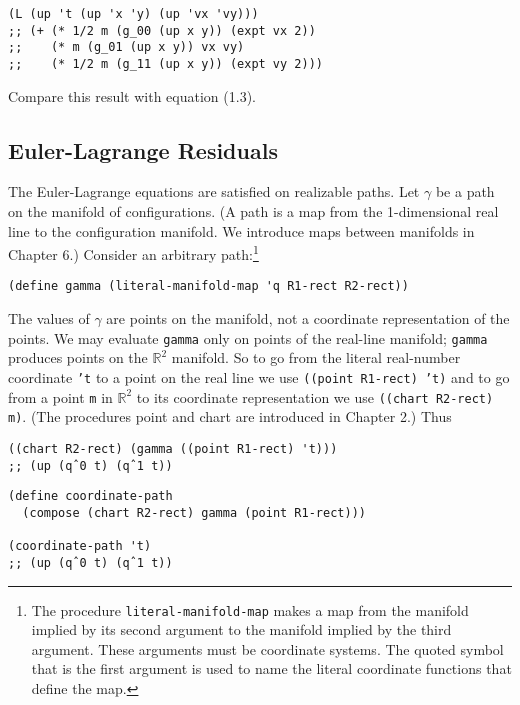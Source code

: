 \documentclass[11pt]{article}
\begin{document}
\begin{verbatim}
(L (up 't (up 'x 'y) (up 'vx 'vy)))
;; (+ (* 1/2 m (g_00 (up x y)) (expt vx 2))
;;    (* m (g_01 (up x y)) vx vy)
;;    (* 1/2 m (g_11 (up x y)) (expt vy 2)))
\end{verbatim}

Compare this result with equation (1.3).

\subsection{Euler-Lagrange Residuals}
\label{sec:org6879b30}

The Euler-Lagrange equations are satisfied on realizable paths. Let \(\gamma\)
be a path on the manifold of configurations. (A path is a map from the
1-dimensional real line to the configuration manifold. We introduce maps
between manifolds in Chapter 6.) Consider an arbitrary path:\footnote{The procedure \texttt{literal-manifold-map} makes a map from the manifold
implied by its second argument to the manifold implied by the third argument.
These arguments must be coordinate systems. The quoted symbol that is the first
argument is used to name the literal coordinate functions that define the map.}

\begin{verbatim}
(define gamma (literal-manifold-map 'q R1-rect R2-rect))
\end{verbatim}

The values of \(\gamma\) are points on the manifold, not a coordinate
representation of the points. We may evaluate \texttt{gamma} only on points of the
real-line manifold; \texttt{gamma} produces points on the \(\mathbb{R}^2\) manifold.
So to go from the literal real-number coordinate \texttt{'t} to a point on the real
line we use \texttt{((point R1-rect) 't)} and to go from a point \texttt{m} in
\(\mathbb{R}^2\) to its coordinate representation we use \texttt{((chart R2-rect) m)}.
(The procedures point and chart are introduced in Chapter 2.) Thus

\begin{verbatim}
((chart R2-rect) (gamma ((point R1-rect) 't)))
;; (up (qˆ0 t) (qˆ1 t))
\end{verbatim}

\begin{verbatim}
(define coordinate-path
  (compose (chart R2-rect) gamma (point R1-rect)))

(coordinate-path 't)
;; (up (qˆ0 t) (qˆ1 t))
\end{verbatim}
\end{document}
